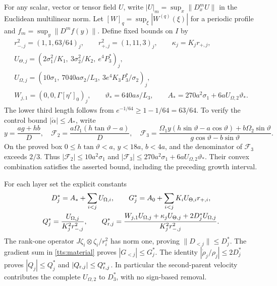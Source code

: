 For any scalar, vector or tensor field $U$, write
$|U|_m=\sup_x\|D_x^mU\|$ in the Euclidean multilinear norm.
Let $[W]_q=\sup_\xi|W^{(q)}(\xi)|$ for a periodic profile and
$f_m=\sup_y\|D^mf(y)\|$. Define fixed bounds on $I$ by
\begin{equation}\label{tts:normdata}
 \begin{gathered}
 r_{-,j}^2=(1,1,63/64)_j,\qquad
 r_{+,j}^2=(1,11,3)_j,\qquad \kappa_j=K_jr_{+,j},\\
 U_{\Theta,j}=(2\sigma_1^2/K_1,\ 3\sigma_2^2/K_2,
                                      \ e^4P_3^*)_j,\\
 U_{\Omega,j}=(10\sigma_1,\ 7040a\sigma_2/L_3,
                             \ 3e^4K_3P_3^*/\sigma_2)_j,\\
 W_{j,1}=(0,0,\Gamma[\eta']_0)_j,\qquad
 \vartheta_*=640as/L_3,\qquad
 A_*=270a^2\sigma_1+6aU_{\Omega,2}\vartheta_*.
 \end{gathered}
\end{equation}
The lower third length follows from
$e^{-1/64}\geq1-1/64=63/64$. To verify the control bound
$|\dot\alpha|\leq A_*$, write
\[
 y=\frac{ag+hb}{D},\quad
 \mathcal F_2=\frac{a\Omega_1(h\tan\vartheta-a)}D,\quad
 \mathcal F_3=
 \frac{\Omega_1y(h\sin\vartheta-a\cos\vartheta)
                  +b\Omega_2\sin\vartheta}
      {g\cos\vartheta-b\sin\vartheta}.
\]
On the proved box $0\leq h\tan\vartheta<a$, $y<18a$,
$b<4a$, and the denominator of $\mathcal F_3$ exceeds $2/3$.
Thus $|\mathcal F_2|\leq10a^2\sigma_1$ and
$|\mathcal F_3|\leq270a^2\sigma_1+
6aU_{\Omega,2}\vartheta_*$. Their convex combination satisfies
the asserted bound, including the preceding growth interval.

For each layer set the explicit constants
\begin{equation}\label{tts:parentbounds}
 \begin{gathered}
 D_j^*=A_*+\sum_{i<j}U_{\Omega,i},\qquad
 G_j^*=A_0+\sum_{i<j}K_iU_{\Theta,i}r_{+,i},\\
 Q_j^*=\frac{U_{\Omega,j}}{K_j^2r_{-,j}^2},\qquad
 Q_{{\rm r},j}^*=
 \frac{W_{j,1}U_{\Omega,j}+\kappa_jU_{\Theta,j}
                              +2D_j^*U_{\Omega,j}}
      {K_j^2r_{-,j}^2}.
 \end{gathered}
\end{equation}
The rank-one operator
$J\zeta_i\otimes\zeta_i/r_i^2$ has norm one, proving
$\|D_{<j}\|\leq D_j^*$. The gradient sum in
\eqref{tts:material} proves $|G_{<j}|\leq G_j^*$.
The identity $|\dot\rho_j/\rho_j|\leq2D_j^*$ proves
$|Q_j|\leq Q_j^*$ and $|Q_{{\rm r},j}|\leq Q_{{\rm r},j}^*$.
In particular the second-parent velocity contributes the complete
$U_{\Omega,2}$ to $D_3^*$, with no sign-based removal.

